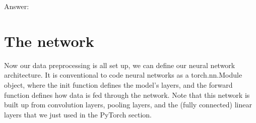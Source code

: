 \documentclass[letterpaper,10pt,english]{jupyterBook}
\begin{document}
\sphinxAtStartPar
Answer:


\section{The network}
\label{\detokenize{notebooks/Tutorial2_ConvolutionalNeuralNetworks/Tutorial2_ConvolutionalNeuralNetworks_student:the-network}}
\sphinxAtStartPar
Now our data pre\sphinxhyphen{}processing is all set up, we can define our neural network architecture. It is conventional to code neural networks as a torch.nn.Module object, where the init function defines the model’s layers, and the forward function defines how data is fed through the network.
Note that this network is built up from convolution layers, pooling layers, and the (fully connected) linear layers that we just used in the PyTorch section.
\end{document}

